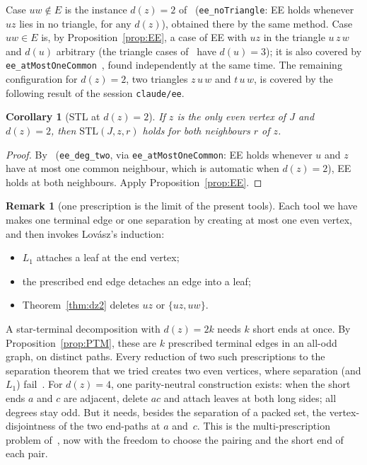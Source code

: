 \documentclass[11pt]{amsart}
\newtheorem{corollary}[theorem]{Corollary}
\theoremstyle{definition}
\newtheorem{remark}[theorem]{Remark}
\newcommand{\lean}[1]{\quad{\footnotesize[Lean: \texttt{#1}]}}
\newcommand{\STL}{\mathrm{STL}}
\begin{document}
Case $uw\notin E$ is the instance $d(z)=2$ of~\cite[Prop.~18(a)]{MS} (\texttt{ee\_noTriangle}:
EE holds whenever $uz$ lies in no triangle, for any $d(z)$), obtained there by the same method. Case
$uw\in E$ is, by Proposition~\ref{prop:EE}, a case of EE with $uz$ in the triangle $u\,z\,w$ and
$d(u)$ arbitrary (the triangle cases of~\cite{MS} have $d(u)=3$); it is also covered by
\texttt{ee\_atMostOneCommon}~\cite{PE}, found independently at the same time. The remaining configuration for $d(z)=2$, two triangles $z\,u\,w$
and $t\,u\,w$, is covered by the following result of the session \texttt{claude/ee}.

\begin{corollary}[STL at $d(z)=2$]\label{cor:dz2}
If $z$ is the only even vertex of $J$ and $d(z)=2$, then $\STL(J,z,r)$ holds for both neighbours $r$
of $z$.\lean{stl\_deg\_two}
\end{corollary}

\begin{proof}
By~\cite{PE} (\texttt{ee\_deg\_two}, via \texttt{ee\_atMostOneCommon}: EE holds whenever $u$ and
$z$ have at most one common neighbour, which is automatic when $d(z)=2$), EE holds at both
neighbours. Apply Proposition~\ref{prop:EE}.
\end{proof}

\begin{remark}[one prescription is the limit of the present tools]\label{rem:limit}
Each tool we have makes one terminal edge or one separation by creating at most one even vertex,
and then invokes Lov\'asz's induction:
\begin{itemize}
\item $L_1$ attaches a leaf at the end vertex;
\item the prescribed end edge detaches an edge into a leaf;
\item Theorem~\ref{thm:dz2} deletes $uz$ or $\{uz,uw\}$.
\end{itemize}
A star-terminal decomposition with $d(z)=2k$ needs $k$ short ends at once. By
Proposition~\ref{prop:PTM}, these are $k$ prescribed terminal edges in an all-odd graph, on
distinct paths. Every reduction of two such prescriptions to the separation theorem that we tried
creates two even vertices, where separation (and $L_1$) fail~\cite[Remark~6.7]{RD}. For $d(z)=4$, one parity-neutral
construction exists: when the short ends $a$ and $c$ are adjacent, delete $ac$ and attach leaves at
both long sides; all degrees stay odd. But it needs, besides the separation of a packed set, the
vertex-disjointness of the two end-paths at $a$ and~$c$. This is the multi-prescription problem
of~\cite[Question~25]{MS}, now with the freedom to choose the pairing and the short end of each pair.
\end{remark}
\end{document}
